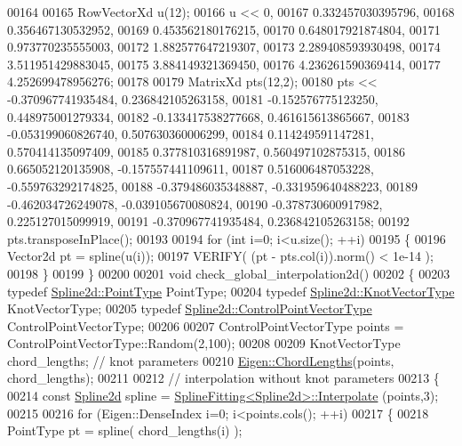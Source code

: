 \begin{DoxyCode}
00164 
00165   RowVectorXd u(12);
00166   u << 0,
00167     0.332457030395796,
00168     0.356467130532952,
00169     0.453562180176215,
00170     0.648017921874804,
00171     0.973770235555003,
00172     1.882577647219307,
00173     2.289408593930498,
00174     3.511951429883045,
00175     3.884149321369450,
00176     4.236261590369414,
00177     4.252699478956276;
00178 
00179   MatrixXd pts(12,2);
00180   pts << -0.370967741935484,   0.236842105263158,
00181     -0.152576775123250,   0.448975001279334,
00182     -0.133417538277668,   0.461615613865667,
00183     -0.053199060826740,   0.507630360006299,
00184     0.114249591147281,   0.570414135097409,
00185     0.377810316891987,   0.560497102875315,
00186     0.665052120135908,  -0.157557441109611,
00187     0.516006487053228,  -0.559763292174825,
00188     -0.379486035348887,  -0.331959640488223,
00189     -0.462034726249078,  -0.039105670080824,
00190     -0.378730600917982,   0.225127015099919,
00191     -0.370967741935484,   0.236842105263158;
00192   pts.transposeInPlace();
00193 
00194   \textcolor{keywordflow}{for} (\textcolor{keywordtype}{int} i=0; i<u.size(); ++i)
00195   \{
00196     Vector2d pt = spline(u(i));
00197     VERIFY( (pt - pts.col(i)).norm() < 1e-14 );
00198   \}
00199 \}
00200 
00201 \textcolor{keywordtype}{void} check\_global\_interpolation2d()
00202 \{
00203   \textcolor{keyword}{typedef} \hyperlink{group___splines___module_a9ade8a2f81dae6eedb8845cb080672bd}{Spline2d::PointType} PointType;
00204   \textcolor{keyword}{typedef} \hyperlink{group___splines___module_a066f7a8b120316c9068b559f0790e9ec}{Spline2d::KnotVectorType} KnotVectorType;
00205   \textcolor{keyword}{typedef} \hyperlink{group___splines___module_ac42c673462a98ad1779761bebeb450bf}{Spline2d::ControlPointVectorType} ControlPointVectorType;
00206 
00207   ControlPointVectorType points = ControlPointVectorType::Random(2,100);
00208 
00209   KnotVectorType chord\_lengths; \textcolor{comment}{// knot parameters}
00210   \hyperlink{group___splines___module_ga1b4cbde5d98411405871accf877552d2}{Eigen::ChordLengths}(points, chord\_lengths);
00211 
00212   \textcolor{comment}{// interpolation without knot parameters}
00213   \{
00214     \textcolor{keyword}{const} \hyperlink{namespace_eigen_aad3d357fe2fef560e7d8e592fb215fbf}{Spline2d} spline = \hyperlink{group___splines___module_adc80b6f0dd0dbbea28130fb254626874}{SplineFitting<Spline2d>::Interpolate}
      (points,3);  
00215 
00216     \textcolor{keywordflow}{for} (Eigen::DenseIndex i=0; i<points.cols(); ++i)
00217     \{
00218       PointType pt = spline( chord\_lengths(i) );

\end{DoxyCode}
